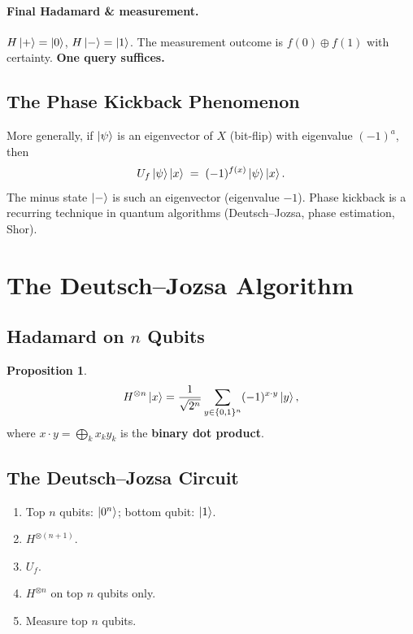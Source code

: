 \documentclass[11pt]{article}
\theoremstyle{definition}
\newtheorem{proposition}{Proposition}[section]
\begin{document}
\paragraph{Final Hadamard \& measurement.}
$H\ket{+}=\ket{0}$, $H\ket{-}=\ket{1}$.  The measurement outcome is $f(0)\oplus f(1)$ with certainty.  \textbf{One query suffices.}

\subsection{The Phase Kickback Phenomenon}

More generally, if $\ket{\psi}$ is an eigenvector of $X$ (bit-flip) with eigenvalue $(-1)^a$, then
\[
    U_f\ket{\psi}\ket{x} \;=\; (-1)^{f(x)}\ket{\psi}\ket{x}.
\]
The minus state $\ket{-}$ is such an eigenvector (eigenvalue $-1$).  Phase kickback is a recurring technique in quantum algorithms (Deutsch--Jozsa, phase estimation, Shor).

\section{The Deutsch--Jozsa Algorithm}

\subsection{Hadamard on $n$ Qubits}

\begin{proposition}
\[
    H^{\otimes n}\ket{x} = \frac{1}{\sqrt{2^n}}\sum_{y\in\{0,1\}^n}(-1)^{x\cdot y}\ket{y},
\]
where $x\cdot y = \bigoplus_{k}x_k y_k$ is the \textbf{binary dot product}.
\end{proposition}

\subsection{The Deutsch--Jozsa Circuit}

\begin{enumerate}
    \item Top $n$ qubits: $\ket{0^n}$; bottom qubit: $\ket{1}$.
    \item $H^{\otimes(n+1)}$.
    \item $U_f$.
    \item $H^{\otimes n}$ on top $n$ qubits only.
    \item Measure top $n$ qubits.
\end{enumerate}
\end{document}
